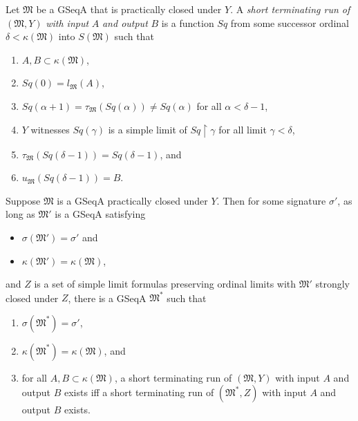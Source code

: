 \documentclass[12pt]{article}
\numberwithin{equation}{section}
\begin{document}
\begin{defi}
Let $\mathfrak{M}$ be a GSeqA that is practically closed under $Y$. A \emph{short terminating run of} $(\mathfrak{M}, Y)$ \emph{with input} $A$ \emph{and output} $B$ is a function $Sq$ from some successor ordinal $\delta < \kappa(\mathfrak{M})$ into $S(\mathfrak{M})$ such that 
\begin{enumerate}[label=(\alph*)]
    \item $A, B \subset \kappa(\mathfrak{M})$,
    \item $Sq(0) = l_{\mathfrak{M}}(A)$,
    \item $Sq(\alpha + 1) = \tau_{\mathfrak{M}}(Sq(\alpha)) \neq Sq(\alpha)$ for all $\alpha < \delta - 1$,
    \item $Y$ witnesses $Sq(\gamma)$ is a simple limit of $Sq \restriction \gamma$ for all limit $\gamma < \delta$,
    \item $\tau_{\mathfrak{M}}(Sq(\delta - 1)) = Sq(\delta - 1)$, and
    \item $u_{\mathfrak{M}}(Sq(\delta - 1)) = B$.
\end{enumerate}
\end{defi}

\begin{prop}\label{prop239}
Suppose $\mathfrak{M}$ is a GSeqA practically closed under $Y$. Then for some signature $\sigma'$, as long as $\mathfrak{M}'$ is a GSeqA satisfying 
\begin{itemize}
    \item $\sigma(\mathfrak{M}') = \sigma'$ and
    \item $\kappa(\mathfrak{M}') = \kappa(\mathfrak{M})$,
\end{itemize}
and $Z$ is a set of simple limit formulas preserving ordinal limits with $\mathfrak{M}'$ strongly closed under $Z$, there is a GSeqA $\mathfrak{M}^*$ such that
\begin{enumerate}[label=(\alph*)]
    \item\label{2391} $\sigma(\mathfrak{M}^*) = \sigma'$,
    \item\label{2392} $\kappa(\mathfrak{M}^*) = \kappa(\mathfrak{M})$, and
    \item\label{2393} for all $A, B \subset \kappa(\mathfrak{M})$, a short terminating run of $(\mathfrak{M}, Y)$ with input $A$ and output $B$ exists iff a short terminating run of $(\mathfrak{M}^*, Z)$ with input $A$ and output $B$ exists.
\end{enumerate}
\end{prop}
\end{document}
